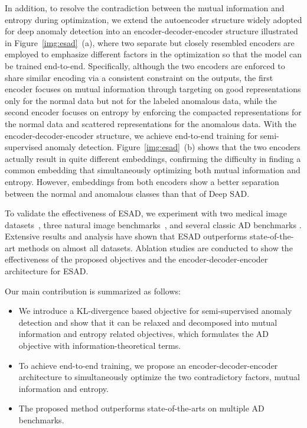 \documentclass{bmvc2k}
\begin{document}
In addition, to resolve the contradiction between the mutual information and entropy during optimization, we extend the autoencoder structure widely adopted for deep anomaly detection into an encoder-decoder-encoder structure illustrated in Figure~\ref{img:esad}~(a), where two separate but closely resembled encoders are employed to emphasize different factors in the optimization so that the model can be trained end-to-end.  
Specifically, although the two encoders are enforced to share similar encoding via a consistent constraint on the outputs, the first encoder focuses on mutual information through targeting on good representations only for the normal data but not for the labeled anomalous data, while the second encoder focuses on entropy by enforcing the compacted representations for the normal data and scattered representations for the anomalous data. With the encoder-decoder-encoder structure, we achieve end-to-end training for semi-supervised anomaly detection. Figure~\ref{img:esad}~(b) shows that the two encoders actually result in quite different embeddings, confirming the difficulty in finding a common embedding that simultaneously optimizing both mutual information and entropy. However, embeddings from both encoders show a better separation between the normal and anomalous classes than that of Deep SAD.

To validate the effectiveness of ESAD, we experiment with two medical image datasets~\cite{bejnordi2017diagnostic,wang2017chestx}, three natural image benchmarks~\cite{lecun1998mnist,xiao2017fashion,krizhevsky2009learning}, and several classic AD benchmarks \cite{Rayana2016}. Extensive results and analysis have shown that ESAD outperforms state-of-the-art methods on almost all datasets. Ablation studies are conducted to show the effectiveness of the proposed objectives and the encoder-decoder-encoder architecture for ESAD.

Our main contribution is summarized as follows: 
\begin{itemize}[leftmargin=*]
    \setlength\itemsep{0em}
    \vspace{-5pt}
    \item We introduce a KL-divergence based objective for semi-supervised anomaly detection and show that it can be relaxed and decomposed into mutual information and entropy related objectives, which formulates the AD objective with information-theoretical terms.
    \vspace{-3pt}
    \item To achieve end-to-end training, we propose an encoder-decoder-encoder architecture to simultaneously optimize the two contradictory factors, mutual information and entropy.
    \vspace{-3pt}
    \item The proposed method outperforms state-of-the-arts on multiple AD benchmarks.
\end{itemize}
\end{document}
